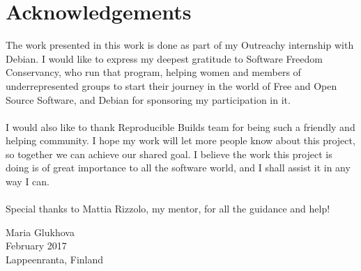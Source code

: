 \section*{Acknowledgements}

The work presented in this work is done as part of my Outreachy internship
with Debian. I would like to express my deepest gratitude to Software Freedom
Conservancy, who run that program, helping women and members of
underrepresented groups to start their journey in the world of Free and Open
Source Software, and Debian for sponsoring my participation in it.\\\\
I would also like to thank Reproducible Builds team for being such a
friendly and helping community. I hope my work will let more people
know about this project, so together we can achieve our shared goal.
I believe the work this project is doing is of great importance to all
the software world, and I shall assist it in any way I can.\\\\
Special thanks to Mattia Rizzolo, my mentor, for all the guidance and help!

Maria Glukhova\\
February 2017\\
Lappeenranta, Finland\\
